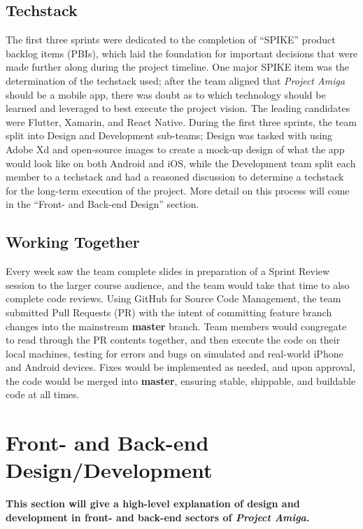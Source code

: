 \documentclass[10pt,american english]{article}
\begin{document}
\subsection*{Techstack}
The first three sprints were dedicated to the completion of ``SPIKE'' product backlog items (PBIs), which laid the foundation for important decisions that were made further along during the project timeline. One major SPIKE item was the determination of the techstack used; after the team aligned that \textit{Project Amiga} should be a mobile app, there was doubt as to which technology should be learned and leveraged to best execute the project vision. The leading candidates were Flutter, Xamarin, and React Native. During the first three sprints, the team split into Design and Development sub-teams; Design was tasked with using Adobe Xd and open-source images to create a mock-up design of what the app would look like on both Android and iOS, while the Development team split each member to a techstack and had a reasoned discussion to determine a techstack for the long-term execution of the project. More detail on this process will come in the ``Front- and Back-end Design'' section.

\subsection*{Working Together}
Every week saw the team complete slides in preparation of a Sprint Review session to the larger course audience, and the team would take that time to also complete code reviews. Using GitHub for Source Code Management, the team submitted Pull Requests (PR) with the intent of committing feature branch changes into the mainstream \textbf{master} branch. Team members would congregate to read through the PR contents together, and then execute the code on their local machines, testing for errors and bugs on simulated and real-world iPhone and Android devices. Fixes would be implemented as needed, and upon approval, the code would be merged into \textbf{master}, ensuring stable, shippable, and buildable code at all times. 
\section*{Front- and Back-end Design/Development}
\textbf{This section will give a high-level explanation of design and development in front- and back-end sectors of \textit{Project Amiga}.}
\end{document}
